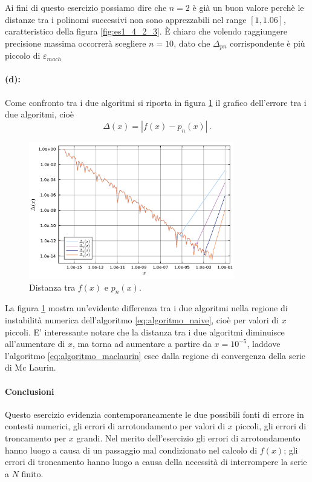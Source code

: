 \documentclass[letterpaper, 12pt]{article}
\numberwithin{equation}{section}    %
\begin{document}
Ai fini di questo esercizio possiamo dire che $n = 2$ è già un buon valore perchè le distanze tra i 
polinomi successivi non sono apprezzabili nel range $[1, 1.06]$, caratteristico della figura \ref{fig:es1_4_2_3}.
È chiaro che volendo raggiungere precisione massima occorrerà scegliere $n = 10$, dato che $\Delta_{pn}$ 
corrispondente è più piccolo di $\varepsilon_{mach}$

\paragraph{(d):}Come confronto tra i due algoritmi si riporta in figura \ref{fig:es1_4_2_5} il grafico 
dell'errore tra i due algoritmi, cioè
\begin{equation}
    \Delta(x) = \left| f(x) - p_n(x) \right|\,.
\end{equation}

\begin{figure}[!ht]
    \centering
    \includegraphics[width=0.8\textwidth]{1425.pdf}
    \caption{Distanza tra $f(x)$ e $p_n(x)$.}
    \label{fig:es1_4_2_5}
\end{figure}

La figura \ref{fig:es1_4_2_5} mostra un'evidente differenza tra i due algoritmi nella regione di instabilità
numerica dell'algoritmo \ref{eq:algoritmo_naive}, cioè per valori di $x$ piccoli. E' interessante notare che 
la distanza tra i due algoritmi diminuisce all'aumentare di $x$, ma torna ad aumentare a partire da
$x = 10^{-5}$, laddove l'algoritmo \ref{eq:algoritmo_maclaurin} esce dalla regione di convergenza della 
serie di Mc Laurin. 
\paragraph{Conclusioni}Questo esercizio evidenzia contemporaneamente le due possibili fonti di errore 
in contesti numerici,
gli errori di arrotondamento per valori di $x$ piccoli, gli errori di troncamento per $x$ grandi. 
Nel merito dell'esercizio gli errori di arrotondamento hanno luogo a causa di un passaggio 
mal condizionato nel calcolo di $f(x)$; gli errori di troncamento hanno luogo a causa della necessità 
di interrompere la serie a $N$ finito.
\end{document}
